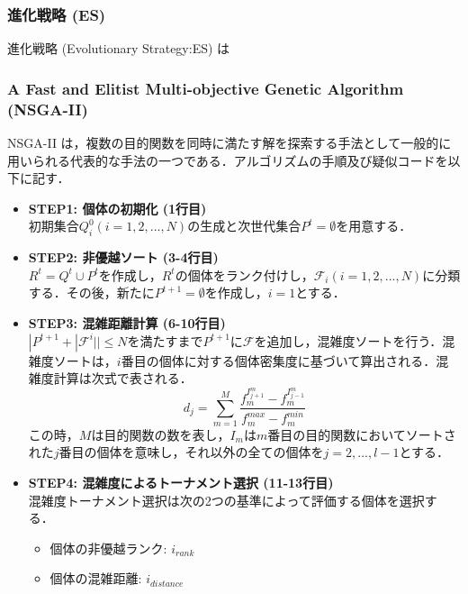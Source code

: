 \documentclass[a4j,11pt]{jarticle}
\begin{document}
 \subsubsection{進化戦略 (ES)}
 進化戦略 (Evolutionary Strategy:ES) は
 \label{sss:ES}



\subsubsection{A Fast and Elitist Multi-objective Genetic Algorithm (NSGA-II)}
\label{sss:nsga}
NSGA-II \cite{NSGAII} は，複数の目的関数を同時に満たす解を探索する手法として一般的に用いられる代表的な手法の一つである．アルゴリズムの手順及び疑似コードを以下に記す．

\begin{itemize}
\item {\bf STEP1: 個体の初期化 (1行目)} \\
初期集合$Q_i^0 (i=1,2,...,N)$の生成と次世代集合$P^t=\emptyset$を用意する．
\item {\bf STEP2: 非優越ソート (3-4行目)}\\
$R^t=Q^t \cup P^t$を作成し，$R^t$の個体をランク付けし，$\mathcal{F}_i (i=1,2,...,N)$に分類する．その後，新たに$P^{t+1}=\emptyset$を作成し，$i=1$とする．
\item {\bf STEP3: 混雑距離計算 (6-10行目)}\\
$|P^{t+1}+|\mathcal{F}^i||\leq N$を満たすまで$P^{t+1}$に$\mathcal{F}$を追加し，混雑度ソートを行う．混雑度ソートは，$i$番目の個体に対する個体密集度に基づいて算出される．混雑度計算は次式で表される．
\begin{equation}
\label{eq:nsga-crowd}
d_j = \sum_{m=1}^M \frac{f_m^{I^{m}_{j+1}}-f_m^{I^{m}_{j-1}}}{f_m^{max}-f_m^{min}}
\end{equation}
この時，$M$は目的関数の数を表し，$I_m$は$m$番目の目的関数においてソートされた$j$番目の個体を意味し，それ以外の全ての個体を$j=2,...,l-1$とする．
\item {\bf STEP4: 混雑度によるトーナメント選択 (11-13行目)}\\
混雑度トーナメント選択は次の2つの基準によって評価する個体を選択する．
\begin{itemize}
  \item 個体の非優越ランク: $i_{rank}$
  \item 個体の混雑距離: $i_{distance}$
\end{itemize}
\end{itemize}
\end{document}
